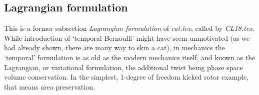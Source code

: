 \subsection{Lagrangian formulation}
\label{s:catLagrForm}

 {
    This is a former subsection {\em Lagrangian formulation}
    of  {\em cat.tex}, called by {\em CL18.tex}.
    }
%
%
While introduction of `temporal Bernoulli' %
might
have seem unmotivated (as we had already shown,
there are many way to skin a cat), in mechanics
the `temporal' formulation is as old as the modern mechanics itself, and
known as the Lagrangian, or variational formulation, the additional twist
being phase space volume conservation. In the simplest, 1-degree of
freedom kicked rotor example, that means area preservation.

